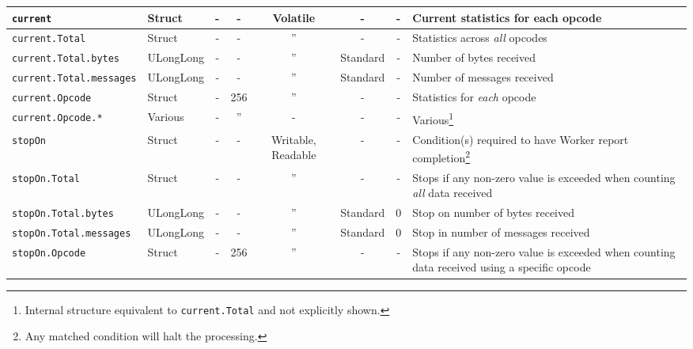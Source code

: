 \documentclass{article}
\begin{document}
\begin{landscape}
\begin{minipage}{\textwidth}
\begin{scriptsize}
\begin{tabular}{|p{3cm}|p{1.5cm}|c|c|c|c|c|p{7cm}|}
      \hline
      \verb+current+                & Struct    & -              & -               & Volatile           & -           & -             & Current statistics for each opcode \\
      \hline
      \verb+current.Total+          & Struct    & -              & -               & ''                  & -           & -             & Statistics across \textit{all} opcodes \\
      \hline
      \verb+current.Total.bytes+    & ULongLong & -              & -               & ''                  & Standard    & -             & Number of bytes received \\
      \hline
      \verb+current.Total.messages+ & ULongLong & -              & -               & ''                  & Standard    & -             & Number of messages received \\
      \hline
      \verb+current.Opcode+         & Struct    & -              & 256             & ''                  & -           & -             & Statistics for \textit{each} opcode \\
      \hline
      \verb+current.Opcode.*+       & Various   & -              & ''               & -                  & -           & -             & Various\footnote{Internal structure equivalent to \texttt{current.Total} and not explicitly shown.} \\
      \hline
      \verb+stopOn+                 & Struct    & -              & -               & Writable, Readable & -           & -             & Condition(s) required to have Worker report completion\footnote{Any matched condition will halt the processing.} \\
      \hline
      \verb+stopOn.Total+           & Struct    & -              & -               & ''                  & -           & -             & Stops if any non-zero value is exceeded when counting \textit{all} data received \\
      \hline
      \verb+stopOn.Total.bytes+     & ULongLong & -              & -               & ''                  & Standard    & 0             & Stop on number of bytes received \\
      \hline
      \verb+stopOn.Total.messages+  & ULongLong & -              & -               & ''                  & Standard    & 0             & Stop in number of messages received \\
      \hline
      \verb+stopOn.Opcode+          & Struct    & -              & 256             & ''                  & -           & -             & Stops if any non-zero value is exceeded when counting data received using a specific opcode \\

\end{tabular}
\end{scriptsize}
\end{minipage}
\end{landscape}
\end{document}

